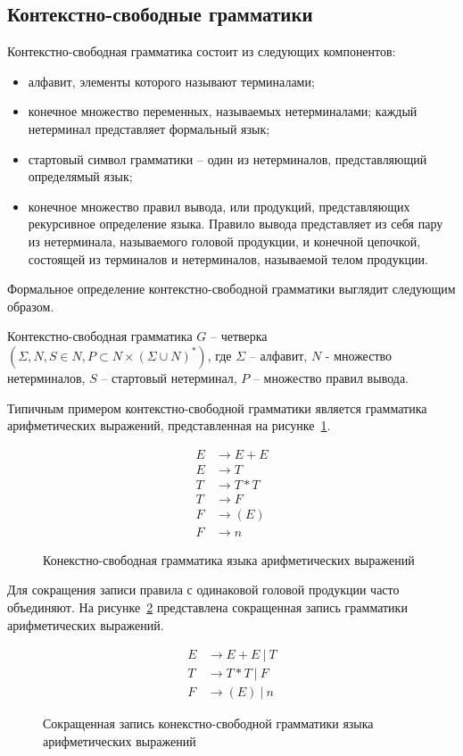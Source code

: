 \subsection{Контекстно-свободные грамматики}
Контекстно-свободная грамматика состоит из следующих компонентов:
\begin{itemize}
    \item алфавит, элементы которого называют терминалами;
    \item конечное множество переменных, называемых нетерминалами; каждый нетерминал представляет формальный язык;
    \item стартовый символ грамматики -- один из нетерминалов, представляющий определямый язык;
    \item конечное множество правил вывода, или продукций, представляющих рекурсивное определение языка.
    Правило вывода представляет из себя пару из нетерминала, называемого головой продукции, и конечной цепочкой,
    состоящей из терминалов и нетерминалов, называемой телом продукции.
\end{itemize}
Формальное определение контекстно-свободной грамматики выглядит следующим образом.
\begin{definition}
Контекстно-свободная грамматика $G$ -- четверка $(\Sigma, N, S \in N, P \subset N \times (\Sigma \cup N)^*)$,
где $\Sigma$ -- алфавит, $N$ - множество нетерминалов, $S$ -- стартовый нетерминал, $P$ -- множество правил вывода.
\end{definition}
Типичным примером контекстно-свободной грамматики является грамматика арифметических выражений, представленная на рисунке~\ref{cf-expr}.
\begin{figure}[htb]
    \begin{align*}
        E &\rightarrow E + E\\
        E &\rightarrow T\\
        T &\rightarrow T * T\\
        T &\rightarrow F\\
        F &\rightarrow (E)\\
        F &\rightarrow n
    \end{align*}
    \caption{Конекстно-свободная грамматика языка арифметических выражений}
    \label{cf-expr}
\end{figure}
Для сокращения записи правила с одинаковой головой продукции часто объединяют. На рисунке~\ref{cf-expr-small} представлена сокращенная запись грамматики арифметических выражений.
\begin{figure}[htb]
    \begin{align*}
        E &\rightarrow E + E\ |\ T\\
        T &\rightarrow T * T\ |\ F\\
        F &\rightarrow (E)\ |\ n
    \end{align*}
    \caption{Сокращенная запись конекстно-свободной грамматики языка арифметических выражений}
    \label{cf-expr-small}
\end{figure}
